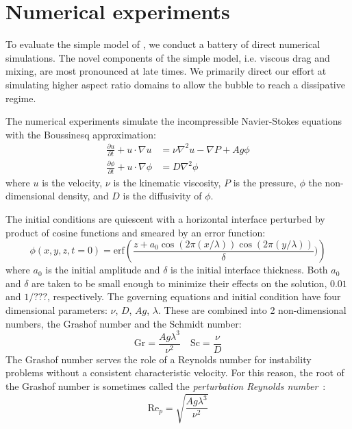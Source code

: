 \section{Numerical experiments} 

To evaluate the simple model of , we conduct a battery of direct numerical simulations.
The novel components of the simple model, i.e. viscous drag and mixing, are most pronounced at late times.
We primarily direct our effort at simulating higher aspect ratio domains to allow the bubble to reach a dissipative regime.

The numerical experiments simulate the incompressible Navier-Stokes equations with the Boussinesq approximation:
\begin{align}
\frac{\partial u}{\partial t} + u \cdot \nabla u &= \nu \nabla^2 u - \nabla P + A g \phi \\
\frac{\partial \phi}{\partial t} + u \cdot \nabla \phi &= D \nabla^2 \phi 
\end{align}
where $u$ is the velocity,
$\nu$ is the kinematic viscosity,
$P$ is the pressure,
$\phi$ the non-dimensional density,
and $D$ is the diffusivity of $\phi$.

The initial conditions are quiescent with a horizontal interface perturbed by product of cosine functions and smeared by an error function:
\begin{equation}
\phi(x,y,z,t=0) = \text{erf}\left(\frac{z + a_0 \cos(2 \pi (x/\lambda)) \cos(2 \pi (y/\lambda))}{\delta})\right)
\end{equation}
where $a_0$ is the initial amplitude and $\delta$ is the initial interface thickness.
Both $a_0$ and $\delta$ are taken to be small enough to minimize their effects on the solution, $0.01$ and $1/???$, respectively.
The governing equations and initial condition have four dimensional parameters: $\nu$, $D$, $Ag$, $\lambda$.
These are combined into 2 non-dimensional numbers, the Grashof number and the Schmidt number:
\begin{equation}
\text{Gr} = \frac{A g \lambda^3}{\nu^2} \quad \text{Sc} = \frac{\nu}{D}
\end{equation}
The Grashof number serves the role of a Reynolds number for instability problems without a consistent characteristic velocity.
For this reason, the root of the Grashof number is sometimes called the \textit{perturbation Reynolds number}~\cite{Wei2012}:
\begin{equation}
\text{Re}_p = \sqrt{\frac{A g \lambda^3}{\nu^2}}
\end{equation}

